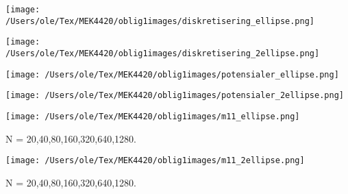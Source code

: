 \documentclass{beamer}
\begin{document}
\begin{frame}
\texttt{[image: /Users/ole/Tex/MEK4420/oblig1images/diskretisering\_ellipse.png]}
\end{frame}

\begin{frame}
\texttt{[image: /Users/ole/Tex/MEK4420/oblig1images/diskretisering\_2ellipse.png]}
\end{frame}

\begin{frame}
\texttt{[image: /Users/ole/Tex/MEK4420/oblig1images/potensialer\_ellipse.png]}
\end{frame}

\begin{frame}
\texttt{[image: /Users/ole/Tex/MEK4420/oblig1images/potensialer\_2ellipse.png]}
\end{frame}

\begin{frame}
\texttt{[image: /Users/ole/Tex/MEK4420/oblig1images/m11\_ellipse.png]}

N = 20,40,80,160,320,640,1280. 
\end{frame}

\begin{frame}
\texttt{[image: /Users/ole/Tex/MEK4420/oblig1images/m11\_2ellipse.png]}

N = 20,40,80,160,320,640,1280.
\end{frame}
\end{document}

